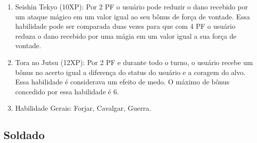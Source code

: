 \begin{enumerate}
	\item Seishin Tekyo (10XP): Por 2 PF o usuário pode reduzir o dano recebido por um ataque mágico em um valor igual ao seu bônus de força de vontade. Essa habilidade pode ser comparada duas vezes para que com 4 PF o usuário reduza o dano recebido por uma mágia em um valor igual a sua força de vontade.
	
	\item Tora no Jutsu (12XP): Por 2 PF e durante todo o turno, o usuário recebe um bônus no acerto igual a diferença do status do usuário e a coragem do alvo. Essa habilidade é considerava um efeito de medo. O máximo de bônus concedido por essa habilidade é 6.
			
	\item Habilidade Gerais: Forjar, Cavalgar, Guerra.
	
\end{enumerate}

\subsection{Soldado} 

